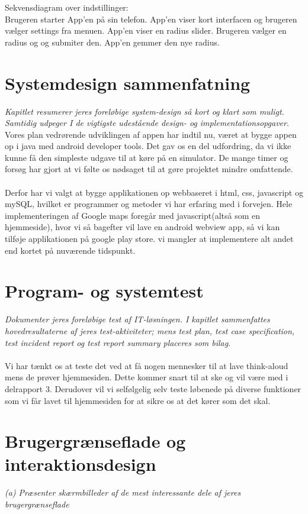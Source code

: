 \documentclass[12pt]{article}
\begin{document}
Sekvensdiagram over indstillinger:\\
Brugeren starter App'en på sin telefon. App'en viser kort interfacen og brugeren vælger settings fra menuen.
App'en viser en radius slider. Brugeren vælger en radius og og submiter den. App'en gemmer den nye radius.


\pagebreak

\section{Systemdesign sammenfatning}
\textit{Kapitlet resumerer jeres foreløbige system-design så kort og klart som muligt. Samtidig
udpeger I de vigtigste udestående design- og implementationsopgaver}.\\

Vores plan vedrørende udviklingen af appen har indtil nu, været at bygge appen op i java med android developer tools. Det gav os en del udfordring, da vi ikke kunne få den simpleste udgave til at køre på en simulator. De mange timer og forsøg har gjort at vi følte os nødsaget til at gøre projektet mindre omfattende. 
\\\\
Derfor har vi valgt at bygge applikationen op webbaseret i html, css, javascript og mySQL, hvilket er programmer og metoder vi har erfaring med i forvejen. 
Hele implementeringen af Google maps foregår med javascript(altså som en hjemmeside), hvor vi så bagefter vil lave en android webview app, så vi kan tilføje applikationen på google play store. vi mangler at implementere alt andet end kortet på nuværende tidspunkt.

\section{Program- og systemtest}
\textit{Dokumenter jeres foreløbige test af IT-løsningen. I kapitlet sammenfattes hovedresultaterne af
jeres test-aktiviteter; mens test plan, test case specification, test incident report og test report
summary placeres som bilag}.\\\\
Vi har tænkt os at teste det ved at få nogen mennesker til at lave think-aloud mens de prøver hjemmesiden. Dette kommer snart til at ske og vil være med i delrapport 3. Derudover vil vi selfølgelig selv teste løbenede på diverse funktioner som vi får lavet til hjemmesiden for at sikre os at det kører som det skal.
\pagebreak
\section{Brugergrænseflade og interaktionsdesign}
\textit{(a) Præsenter skærmbilleder af de mest interessante dele af jeres brugergrænseflade}
\end{document}
